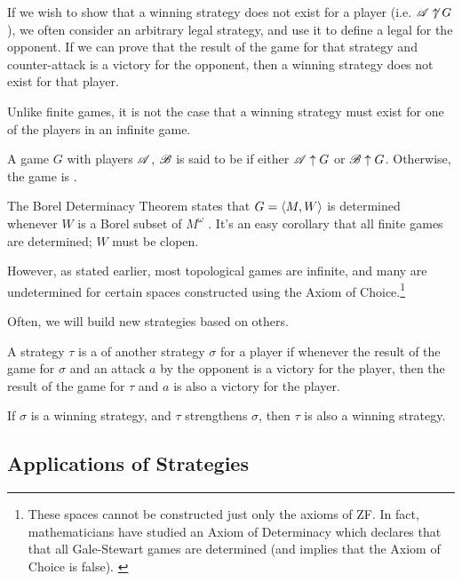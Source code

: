 If we wish to show that a winning strategy does not exist for a player
(i.e. $\mathscr{A}\not\uparrow G$), we
often consider an arbitrary legal strategy, and use it to define a legal
 for the opponent. If we can prove that the result of
the game for that strategy and counter-attack is a victory for the opponent,
then a winning strategy does not exist for that player.

Unlike finite games, it is not the case that a winning strategy must exist for
one of the players in an infinite game.

\begin{defn}
  A game $G$ with players $\mathscr{A}$, $\mathscr{B}$ is said to be 
  if either $\mathscr{A} \uparrow G$ or $\mathscr{B} \uparrow G$.
  Otherwise, the game is .
\end{defn}

The Borel Determinacy Theorem states that $G=\langle M,W\rangle$ is determined whenever
$W$ is a Borel subset of $M^\omega$ \cite{MR0403976}. It's an easy corollary that
all finite games are determined; $W$ must be clopen.

However, as stated earlier, most topological games are infinite,
and many are undetermined for certain spaces constructed using the Axiom of
Choice.\footnote{
  These spaces cannot be constructed just only the axioms of ZF. In fact,
  mathematicians have studied an Axiom of Determinacy which declares that
  that all Gale-Stewart games are determined (and implies that the Axiom
  of Choice is false). \cite{MR0140430}
}

Often, we will build new strategies based on others.

\begin{defn}
  A strategy $\tau$ is a  of another strategy $\sigma$
  for a player if whenever the result of the game for $\sigma$ and an attack
  $a$ by the opponent is a victory for the player, then the result of the game
  for $\tau$ and $a$ is also a victory for the player.
\end{defn}

\begin{prop}
  If $\sigma$ is a winning strategy, and $\tau$ strengthens $\sigma$,
  then $\tau$ is also a winning strategy.
\end{prop}

\subsection{Applications of Strategies}

